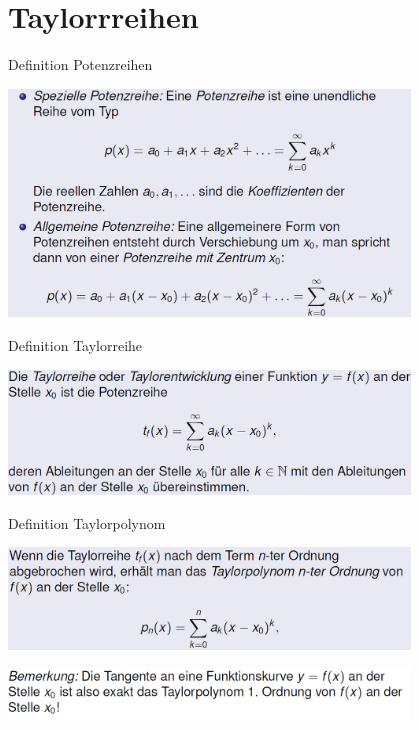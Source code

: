 \section{Taylorrreihen}
\begin{definition}{Definition Potenzreihen}
  \begin{centering}
  \includegraphics[width=0.8\textwidth]{images/2024-06-02-19-11-36.png}\\
  \end{centering}
\end{definition}
\begin{definition}{Definition Taylorreihe}\\
  \begin{centering}
  \includegraphics[width=0.8\textwidth]{images/2024-06-02-19-14-52.png}\\
  \end{centering}
\end{definition}
\begin{definition}{Definition Taylorpolynom}\\
  \begin{centering}
  \includegraphics[width=0.8\textwidth]{images/2024-06-02-19-16-13.png}\\
  \end{centering}
  \begin{centering}
  \includegraphics[width=0.8\textwidth]{images/2024-06-02-19-16-27.png}\\
  \end{centering}
\end{definition}
